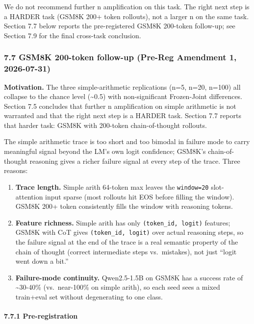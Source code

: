 \documentclass[
]{article}
\begin{document}
We do not recommend further n amplification on this task. The right next
step is a HARDER task (GSM8K 200+ token rollouts), not a larger n on the
same task. Section 7.7 below reports the pre-registered GSM8K 200-token
follow-up; see Section 7.9 for the final cross-task conclusion.

\subsubsection{7.7 GSM8K 200-token follow-up (Pre-Reg Amendment 1,
2026-07-31)}\label{gsm8k-200-token-follow-up-pre-reg-amendment-1-2026-07-31}

\textbf{Motivation.} The three simple-arithmetic replications (n=5,
n=20, n=100) all collapse to the chance level (\textasciitilde0.5) with
non-significant Frozen-Joint differences. Section 7.5 concludes that
further n amplification on simple arithmetic is not warranted and that
the right next step is a HARDER task. Section 7.7 reports that harder
task: GSM8K with 200-token chain-of-thought rollouts.

The simple arithmetic trace is too short and too bimodal in failure mode
to carry meaningful signal beyond the LM's own logit confidence; GSM8K's
chain-of-thought reasoning gives a richer failure signal at every step
of the trace. Three reasons:

\begin{enumerate}
\def\labelenumi{\arabic{enumi}.}
\item
  \textbf{Trace length.} Simple arith 64-token max leaves the
  \texttt{window=20} slot-attention input sparse (most rollouts hit EOS
  before filling the window). GSM8K 200+ token consistently fills the
  window with reasoning tokens.
\item
  \textbf{Feature richness.} Simple arith has only
  \texttt{(token\_id,\ logit)} features; GSM8K with CoT gives
  \texttt{(token\_id,\ logit)} over actual reasoning steps, so the
  failure signal at the end of the trace is a real semantic property of
  the chain of thought (correct intermediate steps vs.~mistakes), not
  just ``logit went down a bit.''
\item
  \textbf{Failure-mode continuity.} Qwen2.5-1.5B on GSM8K has a success
  rate of \textasciitilde30-40\% (vs.~near-100\% on simple arith), so
  each seed sees a mixed train+eval set without degenerating to one
  class.
\end{enumerate}

\paragraph{7.7.1 Pre-registration}\label{pre-registration}
\end{document}
